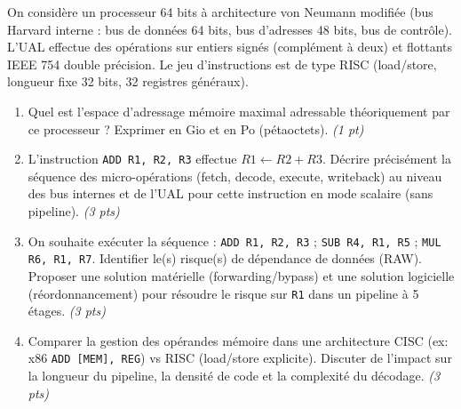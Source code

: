 \documentclass[11pt]{article}
\begin{document}
\begin{exercice}
On considère un processeur 64 bits à architecture von Neumann modifiée (bus Harvard interne : bus de données 64 bits, bus d'adresses 48 bits, bus de contrôle). L'UAL effectue des opérations sur entiers signés (complément à deux) et flottants IEEE 754 double précision. Le jeu d'instructions est de type RISC (load/store, longueur fixe 32 bits, 32 registres généraux).
\begin{enumerate}
    \item Quel est l'espace d'adressage mémoire maximal adressable théoriquement par ce processeur ? Exprimer en Gio et en Po (pétaoctets). \textit{(1 pt)}
    \item L'instruction \texttt{ADD R1, R2, R3} effectue $R1 \leftarrow R2 + R3$. Décrire précisément la séquence des micro-opérations (fetch, decode, execute, writeback) au niveau des bus internes et de l'UAL pour cette instruction en mode scalaire (sans pipeline). \textit{(3 pts)}
    \item On souhaite exécuter la séquence : \texttt{ADD R1, R2, R3} ; \texttt{SUB R4, R1, R5} ; \texttt{MUL R6, R1, R7}. Identifier le(s) risque(s) de dépendance de données (RAW). Proposer une solution matérielle (forwarding/bypass) et une solution logicielle (réordonnancement) pour résoudre le risque sur \texttt{R1} dans un pipeline à 5 étages. \textit{(3 pts)}
    \item Comparer la gestion des opérandes mémoire dans une architecture CISC (ex: x86 \texttt{ADD [MEM], REG}) vs RISC (load/store explicite). Discuter de l'impact sur la longueur du pipeline, la densité de code et la complexité du décodage. \textit{(3 pts)}
\end{enumerate}
\end{exercice}
\end{document}
